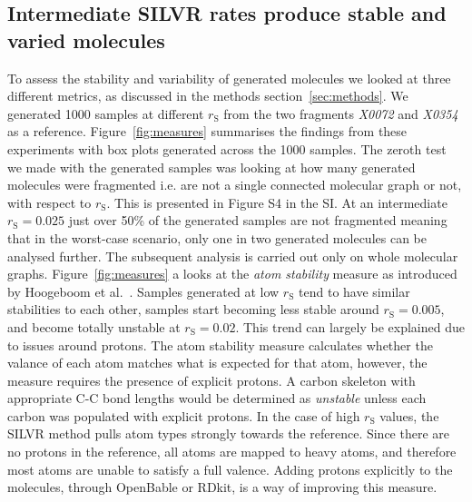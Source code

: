 \documentclass[journal=jacsat,manuscript=article]{achemso}
\begin{document}
\subsection{Intermediate SILVR rates produce stable and varied molecules}
To assess the stability and variability of generated molecules we looked at three different metrics, as discussed in the methods section~\ref{sec:methods}. We generated 1000 samples at different $r_{\mathrm{S}}$ from the two fragments \textit{X0072} and \textit{X0354} as a reference. Figure~\ref{fig:measures} summarises the findings from these experiments with box plots generated across the 1000 samples. The zeroth test we made with the generated samples was looking at how many generated molecules were fragmented i.e. are not a single connected molecular graph or not, with respect to $r_{\mathrm{S}}$. This is presented in Figure S4 in the SI. At an intermediate $r_{\mathrm{S}} = 0.025$ just over 50\% of the generated samples are not fragmented meaning that in the worst-case scenario, only one in two generated molecules can be analysed further. The subsequent analysis is carried out only on whole molecular graphs. 
Figure~\ref{fig:measures} a looks at the \textit{atom stability} measure as introduced by Hoogeboom et al.~\cite{hoogeboom2022equivariant}. Samples generated at low $r_{\mathrm{S}}$ tend to have similar stabilities to each other, samples start becoming less stable around $r_{\mathrm{S}}=0.005$, and become totally unstable at $r_{\mathrm{S}}=0.02$. This trend can largely be explained due to issues around protons. The atom stability measure calculates whether the valance of each atom matches what is expected for that atom, however, the measure requires the presence of explicit protons. A carbon skeleton with appropriate C-C bond lengths would be determined as \textit{unstable} unless each carbon was populated with explicit protons. In the case of high $r_{\mathrm{S}}$ values, the SILVR method pulls atom types strongly towards the reference. Since there are no protons in the reference, all atoms are mapped to heavy atoms, and therefore most atoms are unable to satisfy a full valence. Adding protons explicitly to the molecules, through OpenBable or RDkit, is a way of improving this measure. 
\end{document}
